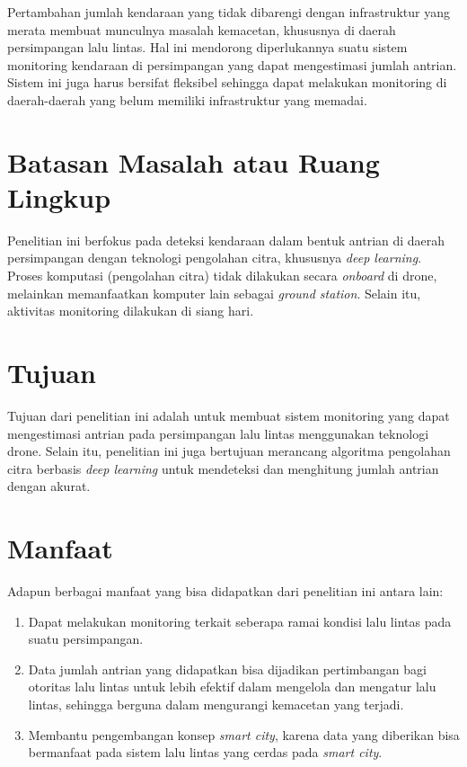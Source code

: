 Pertambahan jumlah kendaraan yang tidak dibarengi dengan infrastruktur yang merata membuat munculnya masalah kemacetan, khususnya di daerah persimpangan lalu lintas. Hal ini mendorong diperlukannya suatu sistem monitoring kendaraan di persimpangan yang dapat mengestimasi jumlah antrian. Sistem ini juga harus bersifat fleksibel sehingga dapat melakukan monitoring di daerah-daerah yang belum memiliki infrastruktur yang memadai.

\section{Batasan Masalah atau Ruang Lingkup}

Penelitian ini berfokus pada deteksi kendaraan dalam bentuk antrian di daerah persimpangan dengan teknologi pengolahan citra, khususnya \emph{deep learning}. Proses komputasi (pengolahan citra) tidak dilakukan secara \emph{onboard} di drone, melainkan memanfaatkan komputer lain sebagai \emph{ground station}. Selain itu, aktivitas monitoring dilakukan di siang hari.  

\section{Tujuan}

Tujuan dari penelitian ini adalah untuk membuat sistem monitoring yang dapat mengestimasi antrian pada persimpangan lalu lintas menggunakan teknologi drone. Selain itu, penelitian ini juga bertujuan merancang algoritma pengolahan citra berbasis \emph{deep learning} untuk mendeteksi dan menghitung jumlah antrian dengan akurat.

\section{Manfaat}

Adapun berbagai manfaat yang bisa didapatkan dari penelitian ini antara lain:
\begin{enumerate}
    \item Dapat melakukan monitoring terkait seberapa ramai kondisi lalu lintas pada suatu persimpangan.
    \item Data jumlah antrian yang didapatkan bisa dijadikan pertimbangan bagi otoritas lalu lintas untuk lebih efektif dalam mengelola dan mengatur lalu lintas, sehingga berguna dalam mengurangi kemacetan yang terjadi.
    \item Membantu pengembangan konsep \emph{smart city}, karena data yang diberikan bisa bermanfaat pada sistem lalu lintas yang cerdas pada \emph{smart city}.
\end{enumerate}
